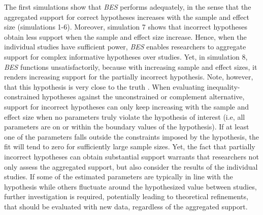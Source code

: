 \documentclass[
  authoryear,
  preprint,
  5p,
  twocolumn]{elsarticle}
\begin{document}
The first simulations show that \emph{BES} performs adequately, in the
sense that the aggregated support for correct hypotheses increases with
the sample and effect size (simulations 1-6). Moreover, simulation 7
shows that incorrect hypotheses obtain less support when the sample and
effect size increase. Hence, when the individual studies have sufficient
power, \emph{BES} enables researchers to aggregate support for complex
informative hypotheses over studies. Yet, in simulation 8, \emph{BES}
functions unsatisfactorily, because with increasing sample and effect
sizes, it renders increasing support for the partially incorrect
hypothesis. Note, however, that this hypothesis is very close to the
truth \citep[Bayes factors have been proven to prefer the model that is
closest, in terms of Kullback-Leibler divergence, to the true
data-generating model; see][]{ly_bf_2016, berger2013statistical}. When
evaluating inequality-constrained hypotheses against the unconstrained
or complement alternative, support for incorrect hypotheses can only
keep increasing with the sample and effect size when no parameters truly
violate the hypothesis of interest (i.e, all parameters are on or within
the boundary values of the hypothesis). If at least one of the
parameters falls outside the constraints imposed by the hypothesis, the
fit will tend to zero for sufficiently large sample sizes. Yet, the fact
that partially incorrect hypotheses can obtain substantial support
warrants that researchers not only assess the aggregated support, but
also consider the results of the individual studies. If some of the
estimated parameters are typically in line with the hypothesis while
others fluctuate around the hypothesized value between studies, further
investigation is required, potentially leading to theoretical
refinements, that should be evaluated with new data, regardless of the
aggregated support.
\end{document}
